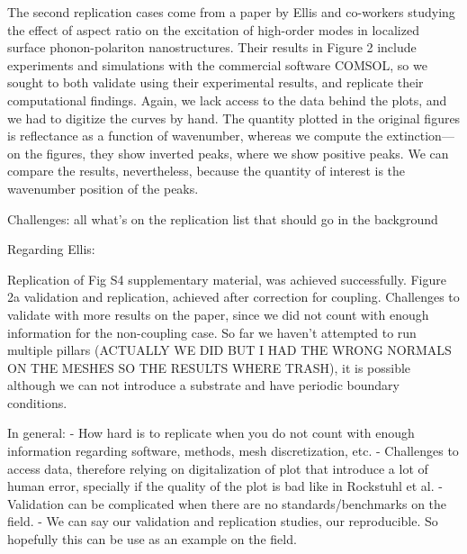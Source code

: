 The second replication cases come from a paper by Ellis and co-workers \cite{ellis2016} studying the effect of aspect ratio on the excitation of high-order modes in localized surface phonon-polariton nanostructures. 
Their results in Figure 2 include experiments and simulations with the commercial software COMSOL, so we sought to both validate \pygbe using their experimental results, and replicate their computational findings. 
Again, we lack access to the data behind the plots, and we had to digitize the curves by hand. 
The quantity plotted in the original figures is reflectance as a function of wavenumber, whereas we compute the extinction---on the figures, they show inverted peaks, where we show positive peaks.
We can compare the results, nevertheless, because the quantity of interest is the wavenumber position of the peaks.

Challenges: all what's on the replication list that should go in the background 

Regarding Ellis:

Replication of Fig S4 supplementary material, was achieved successfully. 
Figure 2a validation and replication, achieved after correction for coupling. 
Challenges to validate with more results on the paper, since we did not count with enough 
information for the non-coupling case. So far we haven't attempted to run multiple pillars 
(ACTUALLY WE DID BUT I HAD THE WRONG NORMALS ON THE MESHES SO THE RESULTS WHERE TRASH), it is possible although we can not
introduce a substrate and have periodic boundary conditions.  


In general:
- How hard is to replicate when you do not count with enough information regarding software, methods, mesh discretization, etc. 
- Challenges to access data, therefore relying on digitalization of plot that introduce a lot of human error, specially if the quality 
of the plot is bad like in Rockstuhl et al. 
- Validation can be complicated when there are no standards/benchmarks on the field.
- We can say our validation and replication studies, our reproducible. So hopefully this can be use as
 an example on the field. 